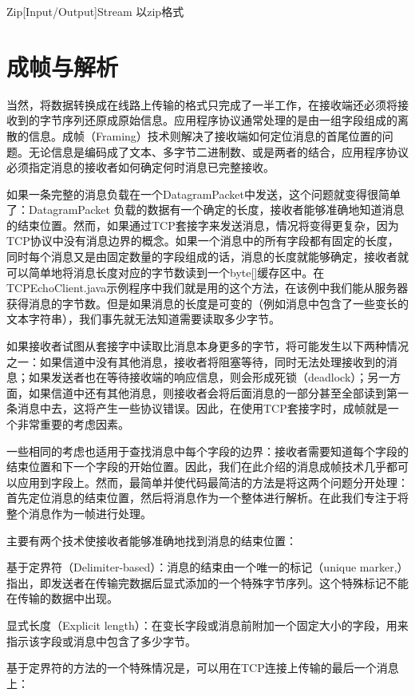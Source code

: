 	Zip[Input/Output]Stream      以zip格式

\section{成帧与解析} 

	当然，将数据转换成在线路上传输的格式只完成了一半工作，在接收端还必须将接收到的字节序列还原成原始信息。应用程序协议通常处理的是由一组字段组成的离散的信息。成帧（Framing）技术则解决了接收端如何定位消息的首尾位置的问题。无论信息是编码成了文本、多字节二进制数、或是两者的结合，应用程序协议必须指定消息的接收者如何确定何时消息已完整接收。 

	如果一条完整的消息负载在一个DatagramPacket中发送，这个问题就变得很简单了：DatagramPacket 负载的数据有一个确定的长度，接收者能够准确地知道消息的结束位置。然而，如果通过TCP套接字来发送消息，情况将变得更复杂，因为TCP协议中没有消息边界的概念。如果一个消息中的所有字段都有固定的长度，同时每个消息又是由固定数量的字段组成的话，消息的长度就能够确定，接收者就可以简单地将消息长度对应的字节数读到一个byte[]缓存区中。在TCPEchoClient.java示例程序中我们就是用的这个方法，在该例中我们能从服务器获得消息的字节数。但是如果消息的长度是可变的（例如消息中包含了一些变长的文本字符串），我们事先就无法知道需要读取多少字节。 

	如果接收者试图从套接字中读取比消息本身更多的字节，将可能发生以下两种情况之一：如果信道中没有其他消息，接收者将阻塞等待，同时无法处理接收到的消息；如果发送者也在等待接收端的响应信息，则会形成死锁（deadlock）；另一方面，如果信道中还有其他消息，则接收者会将后面消息的一部分甚至全部读到第一条消息中去，这将产生一些协议错误。因此，在使用TCP套接字时，成帧就是一个非常重要的考虑因素。 

	一些相同的考虑也适用于查找消息中每个字段的边界：接收者需要知道每个字段的结束位置和下一个字段的开始位置。因此，我们在此介绍的消息成帧技术几乎都可以应用到字段上。然而，最简单并使代码最简洁的方法是将这两个问题分开处理：首先定位消息的结束位置，然后将消息作为一个整体进行解析。在此我们专注于将整个消息作为一帧进行处理。

	主要有两个技术使接收者能够准确地找到消息的结束位置： 

	基于定界符（Delimiter-based）：消息的结束由一个唯一的标记（unique marker,）指出，即发送者在传输完数据后显式添加的一个特殊字节序列。这个特殊标记不能在传输的数据中出现。 

	显式长度（Explicit length）：在变长字段或消息前附加一个固定大小的字段，用来指示该字段或消息中包含了多少字节。 

	基于定界符的方法的一个特殊情况是，可以用在TCP连接上传输的最后一个消息上：

